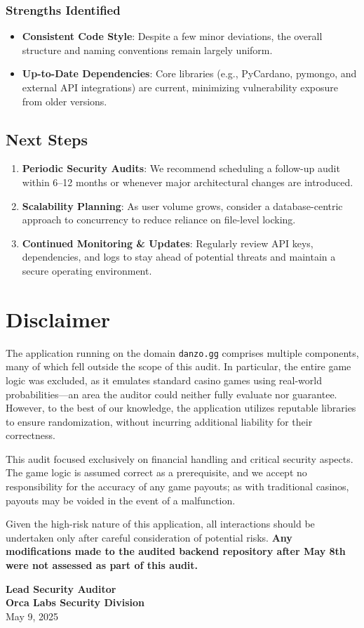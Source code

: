 \documentclass[11pt,a4paper]{report}
\begin{document}
\subsection{Strengths Identified}
\begin{itemize}
    \item \textbf{Consistent Code Style}: Despite a few minor deviations, the overall structure and naming conventions remain largely uniform.
    \item \textbf{Up-to-Date Dependencies}: Core libraries (e.g., PyCardano, pymongo, and external API integrations) are current, minimizing vulnerability exposure from older versions.
\end{itemize}

\section{Next Steps}
\begin{enumerate}
    \item \textbf{Periodic Security Audits}: We recommend scheduling a follow-up audit within 6–12 months or whenever major architectural changes are introduced.
    \item \textbf{Scalability Planning}: As user volume grows, consider a database-centric approach to concurrency to reduce reliance on file-level locking.
    \item \textbf{Continued Monitoring \& Updates}: Regularly review API keys, dependencies, and logs to stay ahead of potential threats and maintain a secure operating environment.
\end{enumerate}

\chapter{Disclaimer}

The application running on the domain \texttt{danzo.gg} comprises multiple components, many of which fell outside the scope of this audit. In particular, the entire game logic was excluded, as it emulates standard casino games using real-world probabilities—an area the auditor could neither fully evaluate nor guarantee. However, to the best of our knowledge, the application utilizes reputable libraries to ensure randomization, without incurring additional liability for their correctness.

This audit focused exclusively on financial handling and critical security aspects. The game logic is assumed correct as a prerequisite, and we accept no responsibility for the accuracy of any game payouts; as with traditional casinos, payouts may be voided in the event of a malfunction.

Given the high-risk nature of this application, all interactions should be undertaken only after careful consideration of potential risks. \textbf{Any modifications made to the audited backend repository after May 8th were not assessed as part of this audit.}

\vspace{2cm}

\noindent\textbf{Lead Security Auditor}\\
\textbf{Orca Labs Security Division}\\
May 9, 2025
\end{document}
